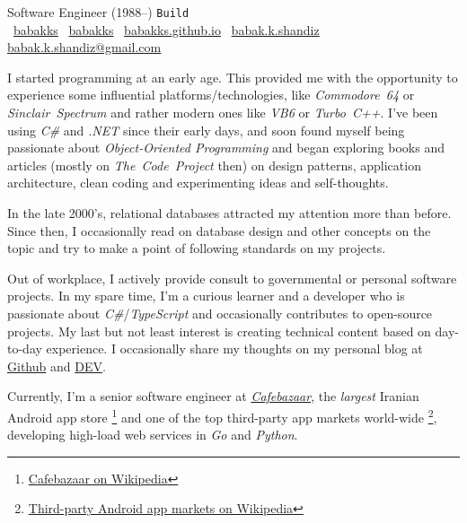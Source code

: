 \documentclass[10pt,a4paper]{article}
\begin{document}
%
{Software Engineer (1988--)}%
{\tiny\color{gray}\texttt{Build\buildno}}
\\
\noindent
\githubmark~\href{https://github.com/babakks}{babakks}
\headerentrybreak
\devbadge~\href{https://dev.to/babakks}{babakks}
\headerentrybreak
{}~\href{https://babakk.github.io}{babakks.github.io}
\hfill
\skypeicon~\href{skype:live:babak.k.shandiz}{babak.k.shandiz}
\headerentrybreak
{}~%
\href{mailto:babak.k.shandiz@gmail.com}{babak.k.shandiz@gmail.com}

\spacedhrule{0.9em}{-0.4em}

\vspace{-1.3em} %
\begin{multicols}{2}  %
    \noindent
    I started programming at an early age. This provided me with the opportunity
    to experience some influential platforms/technologies, like
    \textit{Commodore~64} or \textit{Sinclair~Spectrum} and rather modern ones
    like \textit{VB6} or \textit{Turbo~C++}. I've been using \textit{C\#} and
    \textit{.NET} since their early days, and soon found myself being passionate
    about \textit{Object-Oriented Programming} and began exploring books and
    articles (mostly on \textit{The~Code~Project} then) on design patterns,
    application architecture, clean coding and experimenting ideas and
    self-thoughts.

    In the late 2000's, relational databases attracted my attention more than
    before. Since then, I occasionally read on database design and other
    concepts on the topic and try to make a point of following standards on my
    projects.

    Out of workplace, I actively provide consult to governmental or personal
    software projects. In my spare time, I'm a curious learner and a developer who
    is passionate about \textit{C\#}/\textit{TypeScript} and occasionally
    contributes to open-source projects. My last but not least interest is
    creating technical content based on day-to-day experience. I
    occasionally share my thoughts on my personal blog at
    \href{https://babakks.github.io}{Github} and
    \href{https://dev.to/babakks}{DEV}.

    Currently, I'm a senior software engineer at
    \href{https://cafebazaar.ir}{\emph{Cafebazaar}}, the \textit{largest}
    Iranian Android app store%
    \footnote{\label{cb-on-wiki}%
        \href{https://en.wikipedia.org/wiki/Cafe\_Bazaar}{Cafebazaar on Wikipedia}}%
    and one of the top third-party app markets world-wide%
    \footnote{\label{3rd-party-stores-on-wiki}%
        \href{https://en.wikipedia.org/wiki/List\_of\_mobile\_app\_distribution\_platforms\#Third-party\_platforms}%
        {Third-party Android app markets on Wikipedia}},
    developing high-load web services in \textit{Go} and \textit{Python}.
\end{multicols}
\spacedhrule{0.5em}{-0.4em}
\end{document}
